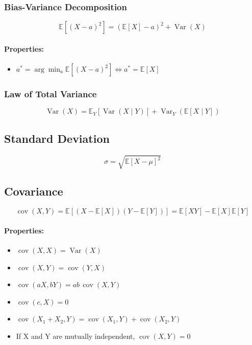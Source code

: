 \documentclass{article}
\begin{document}
\subsubsection{Bias-Variance Decomposition}
\[
    \mathbb{E}[(X-a)^2] = (\mathbb{E}[X]-a)^2 + \operatorname{Var}(X)
\]
\paragraph{Properties:}
\begin{itemize}
    \item $ \displaystyle a^* = \arg\min_{a} \mathbb{E}[(X-a)^2] \Leftrightarrow a^* = \mathbb{E}[X] $
\end{itemize}

\subsubsection{Law of Total Variance}
\[
    \operatorname{Var}(X) = \mathbb{E}_Y[\operatorname{Var}(X \mid Y)] + \operatorname{Var}_Y(\mathbb{E}[X \mid Y])
\]


\subsection{Standard Deviation}
\[
    \sigma = \sqrt{\mathbb{E}[X-\mu]^2}
\]

\subsection{Covariance}
\[
    \operatorname{cov}(X,Y) = \mathbb{E}[(X-\mathbb{E}[X])(Y-\mathbb{E}[Y])] = \mathbb{E}[XY] - \mathbb{E}[X]\mathbb{E}[Y]
\]
\paragraph{Properties:}
\begin{itemize}
    \item $ \operatorname{cov}(X, X) = \operatorname{Var}(X) $
    \item $ \operatorname{cov}(X,Y) = \operatorname{cov}(Y,X) $
    \item $ \operatorname{cov}(aX, bY) = ab\,\operatorname{cov}(X,Y) $
    \item $ \operatorname{cov}(c,X) = 0 $
    \item $ \operatorname{cov}(X_1+X_2, Y) = \operatorname{cov}(X_1,Y) + \operatorname{cov}(X_2,Y) $
    \item If X and Y are mutually independent, $ \operatorname{cov}(X,Y) = 0 $
\end{itemize}
\end{document}
